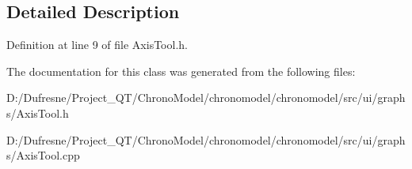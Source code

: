 \subsection{Detailed Description}


Definition at line 9 of file Axis\-Tool.\-h.



The documentation for this class was generated from the following files\-:\begin{DoxyCompactItemize}
\item 
D\-:/\-Dufresne/\-Project\-\_\-\-Q\-T/\-Chrono\-Model/chronomodel/chronomodel/src/ui/graphs/Axis\-Tool.\-h\item 
D\-:/\-Dufresne/\-Project\-\_\-\-Q\-T/\-Chrono\-Model/chronomodel/chronomodel/src/ui/graphs/Axis\-Tool.\-cpp\end{DoxyCompactItemize}

